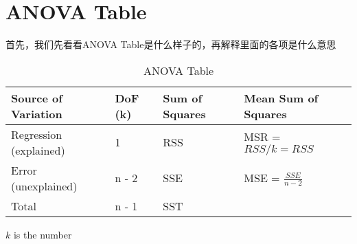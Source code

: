 \documentclass[cn,11pt,chinese]{elegantbook}
\begin{document}
\section{ANOVA Table}
    首先，我们先看看ANOVA Table是什么样子的，再解释里面的各项是什么意思
    \begin{table}[htbp]
        \centering
        \caption{ANOVA Table}
          \begin{tabular}{llll}
          \toprule
          Source of Variation & DoF (k) & Sum of Squares & Mean Sum of Squares \\
          \midrule
          Regression (explained) & 1 & RSS & MSR = \(RSS / k = RSS\)\\
          Error (unexplained) & n - 2 & SSE & MSE = \(\frac{SSE}{n - 2}\)\\
          \midrule
          Total & n - 1 & SST &   \\
          \bottomrule
          \end{tabular}%
        \label{tab:theorem-class}%
    \end{table}%
    \(k\) is the number 
\end{document}
